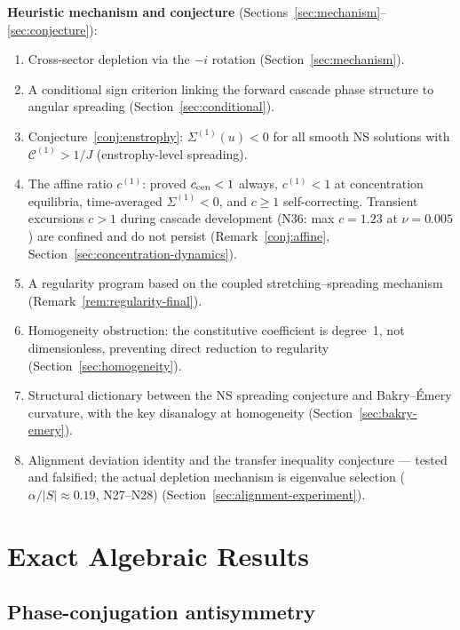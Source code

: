 \documentclass[11pt]{article}
\theoremstyle{definition}
\newcommand{\cC}{\mathcal{C}}
\begin{document}
\noindent\textbf{Heuristic mechanism and conjecture}
(Sections~\ref{sec:mechanism}--\ref{sec:conjecture}):
\begin{enumerate}[leftmargin=2em,label=(H\arabic*)]
\item Cross-sector depletion via the $-i$ rotation
  (Section~\ref{sec:mechanism}).
\item A conditional sign criterion linking the forward
  cascade phase structure to angular spreading
  (Section~\ref{sec:conditional}).
\item Conjecture~\ref{conj:enstrophy}: $\Sigma^{(1)}(u)<0$
  for all smooth NS solutions with $\cC^{(1)} > 1/J$
  (enstrophy-level spreading).
\item The affine ratio $c^{(1)}$: proved $c_{\rm cen}<1$
  always, $c^{(1)}<1$ at concentration equilibria,
  time-averaged $\Sigma^{(1)}<0$, and $c\geq 1$
  self-correcting.  Transient excursions $c>1$ during
  cascade development (N36: max $c=1.23$ at $\nu=0.005$)
  are confined and do not persist
  (Remark~\ref{conj:affine},
  Section~\ref{sec:concentration-dynamics}).
\item A regularity program based on the coupled
  stretching--spreading mechanism
  (Remark~\ref{rem:regularity-final}).
\item Homogeneity obstruction: the constitutive
  coefficient is degree~1, not dimensionless,
  preventing direct reduction to regularity
  (Section~\ref{sec:homogeneity}).
\item Structural dictionary between the NS spreading
  conjecture and Bakry--\'Emery curvature, with
  the key disanalogy at homogeneity
  (Section~\ref{sec:bakry-emery}).
\item Alignment deviation identity and the transfer
  inequality conjecture --- tested and falsified;
  the actual depletion mechanism is eigenvalue
  selection ($\alpha/|S|\approx 0.19$, N27--N28)
  (Section~\ref{sec:alignment-experiment}).
\end{enumerate}

\section{Exact Algebraic Results}
\label{sec:general}

\subsection{Phase-conjugation antisymmetry}
\end{document}
